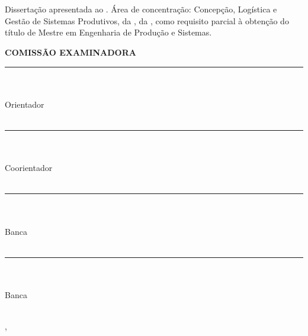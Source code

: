 \begin{center}
    {\singlespacing
    \MakeUppercase{\textbf{\aluno}} \\ [1cm]

    \MakeUppercase{\textbf{\titulo}} \\ [1cm]

    \hspace{.45\textwidth} %
        \begin{minipage}{.5\textwidth}
        \noindent Dissertação apresentada ao \curso. Área de concentração: Concepção, Logística e Gestão de Sistemas Produtivos, da \departamento, da \universidade, como requisito parcial à obtenção do título de Mestre em Engenharia de Produção e Sistemas. \\ [5mm]
        \end{minipage}
    \textbf{COMISSÃO EXAMINADORA} \\ [1cm]
    
    \rule{10cm}{.1mm} \\ \orientador \\ Orientador\\ \universidade \\ [10mm]

    \rule{10cm}{.1mm} \\ \coorientador \\ Coorientador \\ \universidade \\ [10mm]

    \rule{10cm}{.1mm} \\ \convidadoa \\ Banca \\ \univconvidadoa \\ [10mm]
    
    \rule{10cm}{.1mm} \\ \convidadob \\ Banca \\ \univconvidadob \\ [10mm]
    
    \vfill
    
    \cidade, \datadefesa
    }
\end{center}
